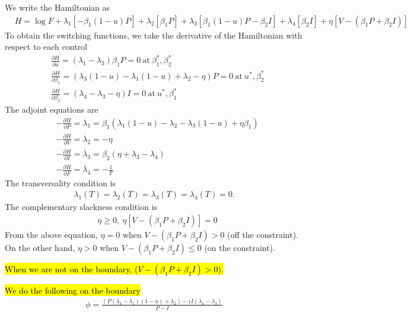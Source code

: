 \documentclass[12pt, oneside]{article}   	%
\begin{document}
We write the Hamiltonian as
%
\begin{align}
& H = \log F + \lambda_1 [ - \beta_1 (1-u) P ] + \lambda_2 [ \beta_1 P ]  + \lambda_3 [ \beta_1 (1-u) P - \beta_2 I ] + \lambda_4 [ \beta_2 I ] + \eta [V - (\beta_1 P + \beta_2 I) ]
\end{align}
%
To obtain the switching functions, we take the derivative of the Hamiltonian with respect to each control 
%
\begin{align}
& \frac{\partial H}{\partial u} = (\lambda_1 - \lambda_3) \beta_1 P = 0\ \mathrm{at}\ \beta_1^*, \beta_2^* \\
&\frac{\partial H}{\partial \beta_1} =  (\lambda_3(1-u) - \lambda_1 (1-u) + \lambda_2 - \eta) P = 0\ \mathrm{at}\ u^*, \beta_2^* \\
&\frac{\partial H}{\partial \beta_2} =  (\lambda_4 - \lambda_3 - \eta) I = 0\ \mathrm{at}\ u^*, \beta_1^*
\end{align}
%
The adjoint equations are
%
\begin{align}
&-\frac{\partial H}{\partial P} = \dot{\lambda_1}  = \beta_1 ( \lambda_1 (1-u) - \lambda_2 - \lambda_3 (1-u) + \eta \beta_1 ) \nonumber \\
&-\frac{\partial H}{\partial V} = \dot{\lambda_2}  = - \eta  \nonumber\\
&-\frac{\partial H}{\partial I} = \dot{\lambda_3}  = \beta_2(\eta + \lambda_3-\lambda_4) \nonumber \\
&-\frac{\partial H}{\partial F} = \dot{\lambda_4}  = -\frac{1}{F}  
\end{align}
The transversality condition is
%
\begin{align}
\lambda_1(T) = \lambda_2(T) = \lambda_3(T) = \lambda_4(T) = 0.
\end{align}
%
The complementary slackness condition is 
\begin{align}
& \eta \geq 0,\ \eta [V-(\beta_1 P + \beta_2 I) ] = 0  
\end{align}
% 
From the above equation,  $\eta = 0$ when $V - (\beta_1 P + \beta_2 I) > 0 $ (off the constraint). On the other hand, $\eta > 0$ when $V - (\beta_1 P + \beta_2 I) \leq 0$ (on the constraint).

\hl{When we are not on the boundary, ($V-(\beta_1 P + \beta_2 I)>0$).}

\hl{We do the following on the boundary}
%
\begin{align}
\phi = \frac{ (P(\lambda_3 - \lambda_1) (1-u) + \lambda_2 ) - (I(\lambda_4 - \lambda_3) }{P - I}
\end{align}
%
\end{document}
